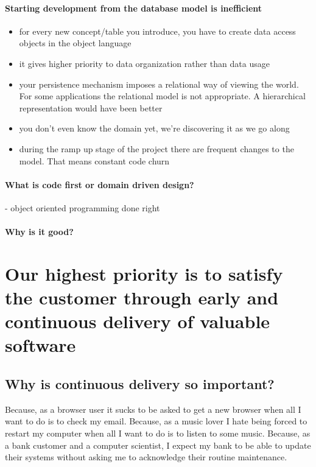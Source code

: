 \documentclass{article}
\begin{document}
\paragraph{Starting development from the database model is inefficient}
\begin{itemize} 
\item for every new concept/table you introduce, you have to create
  data access objects in the object language

\item it gives higher priority to data organization rather than data
  usage
\item your persistence mechanism imposes a relational way of viewing
  the world. For some applications the relational model is not
  appropriate. A hierarchical representation would have been better

\item you don't even know the domain yet, we're discovering it as we
  go along
\item during the ramp up stage of the project there are frequent
  changes to the model. That means constant code churn
\end{itemize}

\paragraph{What is code first or domain driven design?}
- object oriented programming done right

\paragraph{Why is it good?}


\section{Our highest priority is to satisfy the customer through early and continuous delivery of valuable software}

\subsection{Why is continuous delivery so important?}

%
Because, as a browser user it sucks to be asked to get a new browser
when all I want to do is to check my email.
%
Because, as a music lover I hate being forced to restart my computer
when all I want to do is to listen to some music.
%
Because, as a bank customer and a computer scientist, I expect my bank
to be able to update their systems without asking me to acknowledge
their routine maintenance.
%
 
\end{document}
